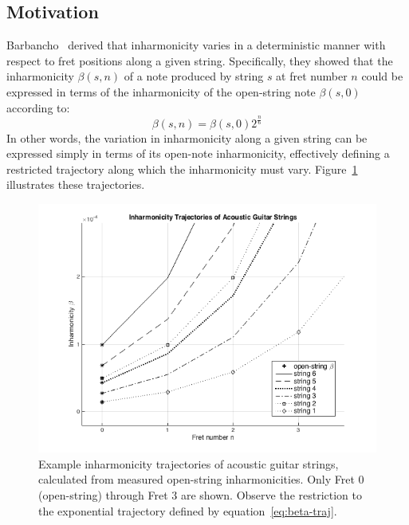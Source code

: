 \documentclass[12pt]{cmuthesis}
\begin{document}
\subsection{Motivation}
Barbancho~\cite{barbanchoi2012} derived that inharmonicity varies in a deterministic manner with respect to fret positions along a given string. Specifically, they showed that the inharmonicity $\beta(s,n)$ of a note produced by string $s$ at fret number $n$ could be expressed in terms of the inharmonicity of the open-string note $\beta(s,0)$ according to:
\begin{equation} 
\label{eq:beta-traj}
\beta(s,n) = \beta(s,0)2^{\frac{n}{6}}
\end{equation}
In other words, the variation in inharmonicity along a given string can be expressed simply in terms of its open-note inharmonicity, effectively defining a restricted trajectory along which the inharmonicity must vary. Figure~\ref{fig:beta-trajectories-ag} illustrates these trajectories.

\begin{figure}[h] 
\centering
\includegraphics[scale=0.70]{beta-trajectories-ag}
\caption{Example inharmonicity trajectories of acoustic guitar strings, calculated from measured open-string inharmonicities. Only Fret 0 (open-string) through Fret 3 are shown. Observe the restriction to the exponential trajectory defined by equation~\eqref{eq:beta-traj}.}
\label{fig:beta-trajectories-ag}
\end{figure}
\end{document}
